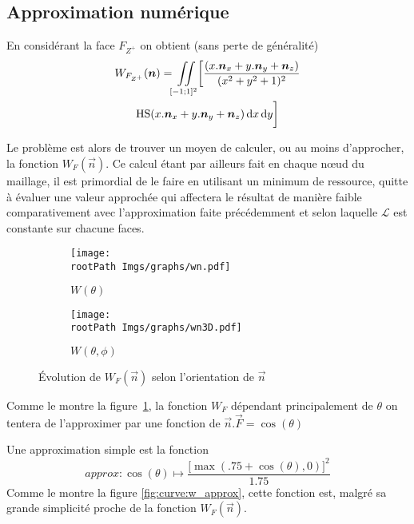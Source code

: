 \documentclass[10pt,a4paper,twoside, twocolumn]{report}
\newcommand*{\rootPath}{../}
\begin{document}
\subsection{Approximation numérique}


En considérant la face $F_{Z^+}$ on obtient (sans perte de généralité)
\begin{multline}
	W_{F_{Z^+}}(\vec n) = \iint\limits_{[-1;1]^2} \biggl[\frac{(x.\vec n_x+y.\vec n_y + \vec n_z)}{(x^2+y^2+1)^2} \\
	\Hs(x.\vec n_x+y.\vec n_y + \vec n_z)\, \mathrm dx\, \mathrm dy\biggr]
\end{multline}

Le problème est alors de trouver un moyen de calculer, ou au moins d'approcher, la fonction $W_F(\vec n)$. Ce calcul étant par ailleurs fait  en chaque nœud du maillage, il est primordial de le faire en utilisant un minimum de ressource, quitte à évaluer une valeur approchée qui affectera le résultat de manière faible comparativement avec l'approximation faite précédemment et selon laquelle $\mathcal L$ est constante sur chacune faces.

\begin{figure}[!ht]\centering
	\begin{subfigure}[b]{0.4\textwidth}\centering
		\texttt{[image: \\rootPath Imgs/graphs/wn.pdf]}
		\caption{$W(\theta)$}
	\end{subfigure}
	\begin{subfigure}[b]{0.4\textwidth}\centering
		\texttt{[image: \\rootPath Imgs/graphs/wn3D.pdf]}
		\caption{$W(\theta,\phi)$}
	\end{subfigure}

	\caption{Évolution de $W_F(\vec n)$ selon l'orientation de $\vec n$ }
	\label{fig:curve:w_theta_phi}
\end{figure}

Comme le montre la figure~\ref{fig:curve:w_theta_phi}, la fonction $W_F$ dépendant principalement de $\theta$ on tentera de l'approximer par une fonction de $\vec n.\vec F = \cos(\theta)$

Une approximation simple est la fonction
\begin{equation}
	approx : \cos(\theta)\mapsto
	\frac{\bigl[\max\left(.75 + \cos(\theta), 0\right)\bigr]^2}{1.75}
\end{equation}
Comme le montre la figure \ref{fig:curve:w_approx}, cette fonction est, malgré sa grande simplicité proche de la fonction $W_F(\vec n)$.
\end{document}
